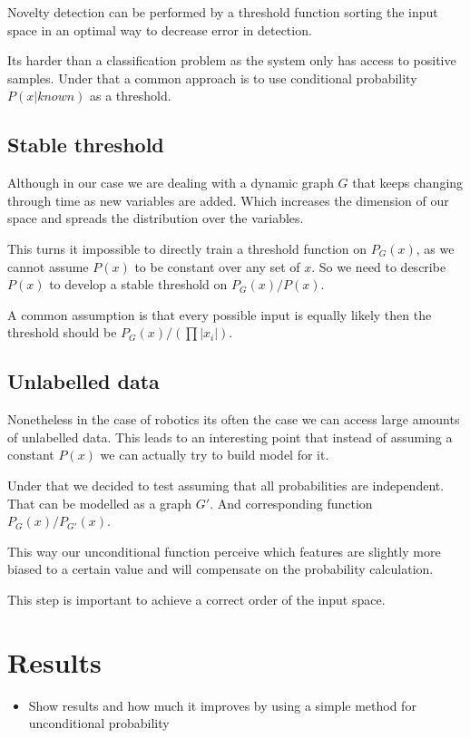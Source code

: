 \documentclass[runningheads,a4paper]{llncs}
\begin{document}
Novelty detection can be performed by a threshold function sorting the input space in an optimal way to
decrease error in detection.

Its harder than a classification problem as the system only has access to positive samples.
Under that a common approach is to use conditional probability $P(x|known)$ as a threshold.

\subsection{Stable threshold}
Although in our case we are dealing with a dynamic graph $G$ that keeps changing through time as new variables
are added. Which increases the dimension of our space and spreads the distribution over the variables.

This turns it impossible to directly train a threshold function on $P_G(x)$, as we cannot assume $P(x)$ to be constant over any set of $x$.
So we need to describe $P(x)$ to develop a stable threshold on $P_G(x)/P(x)$.

A common assumption is that every possible input is equally likely then the threshold
should be $P_G(x)/(\prod |x_i|)$.

\subsection{Unlabelled data}
Nonetheless in the case of robotics its often the case we can access large amounts of unlabelled data.
This leads to an interesting point that instead of assuming a constant $P(x)$ we can actually try to build
model for it.

Under that we decided to test assuming that all probabilities are independent. That can be modelled as a graph $G'$.
And corresponding function $P_G(x)/P_{G'}(x)$.

This way our unconditional function perceive which features are slightly more biased to a certain value and will
compensate on the probability calculation.

This step is important to achieve a correct order of the input space.


\section{Results}
\begin{itemize}
\item Show results and how much it improves by using a simple method for unconditional probability
\end{itemize}
\end{document}

